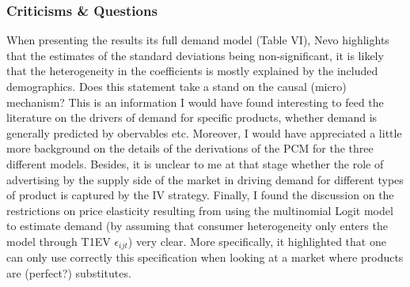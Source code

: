 \documentclass[11pt, final]{article}
\begin{document}
\subsubsection*{Criticisms \& Questions} %
\label{sub:criticisms_&_questions}


When presenting the results its full demand model (Table VI), Nevo highlights that the estimates of the standard deviations being non-significant, it is likely that the heterogeneity in the coefficients is mostly explained by the included demographics. Does this statement take a stand on the causal (micro) mechanism? This is an information I would have found interesting to feed the literature on the drivers of demand for specific products, whether demand is generally predicted by obervables etc.
%
Moreover, I would have appreciated a little more background on the details of the derivations of the PCM for the three different models.
%
Besides, it is unclear to me at that stage whether the role of advertising by the supply side of the market in driving demand for different types of product is captured by the IV strategy. %
%
Finally, I found the discussion on the restrictions on price elasticity resulting from using the multinomial Logit model to estimate demand (by assuming that consumer heterogeneity only enters the model through T1EV $\epsilon_{ijt}$) very clear. More specifically, it highlighted that one can only use correctly this specification when looking at a market where products are (perfect?) substitutes.
\end{document}

